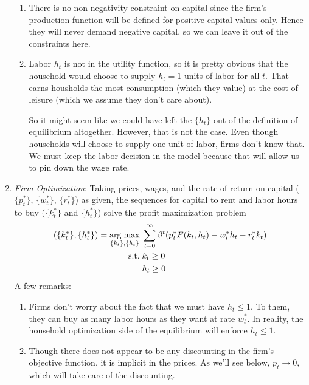 \documentclass[12pt]{article}
\theoremstyle{plain}
\theoremstyle{definition}
\theoremstyle{remark}
\newcommand{\ra}{\rightarrow}
\DeclareMathOperator*{\argmax}{arg\;max}
\newcommand{\sumtinfz}{\sum^\infty_{t=0}}
\begin{document}
\begin{enumerate}
\begin{enumerate}
      \item There is no non-negativity constraint on capital since the
        firm's production function will be defined for positive capital
        values only. Hence they will never demand negative capital, so
        we can leave it out of the constraints here.

      \item Labor $h_t$ is not in the utility function, so it is pretty
        obvious that the household would choose to supply $h_t=1$ units
        of labor for all $t$. That earns housholds the most consumption
        (which they value) at the cost of leisure (which we assume they
        don't care about).

        So it might seem like we could have left the $\{h_t\}$ out of
        the definition of equilibrium altogether. However, that is not
        the case. Even though households will choose to supply one unit
        of labor, firms don't know that. We must keep the labor decision
        in the model because that will allow us to pin down the wage
        rate.
    \end{enumerate}

  \item \emph{Firm Optimization}: Taking
    prices, wages, and the rate of return on capital
    ($\{p^*_t\}$, $\{w^*_t\}$, $\{r^*_t\}$) as given,
    the sequences for capital to rent and labor hours to buy
    ($\{k_t^*\}$ and $\{h_t^*\}$)
    solve the profit maximization problem
    \begin{align}
      (\{k_t^*\}, \{h_t^*\})
      =
      \argmax_{\{k_t\}, \{h_t\}}
        \; &\sumtinfz \beta^t (p^*_t F(k_t,h_t) - w^*_t h_t - r^*_t k_t)
        \label{defn:adce-firm-objfcn}\\
      \text{s.t.} \;
      &k_t \geq 0 \notag\\
      &h_t \geq 0 \notag
    \end{align}
    A few remarks:
    \begin{enumerate}
      \item Firms don't worry about the fact that we must have
        $h_t\leq 1$. To them, they can buy as many labor hours as they
        want at rate $w^*_t$. In reality, the household optimization
        side of the equilibrium will enforce $h_t\leq 1$.

      \item Though there does not appear to be any discounting in the
        firm's objective function, it is implicit in the prices. As
        we'll see below, $p_t\ra 0$, which will take care of the
        discounting.
    \end{enumerate}


\end{enumerate}
\end{document}
